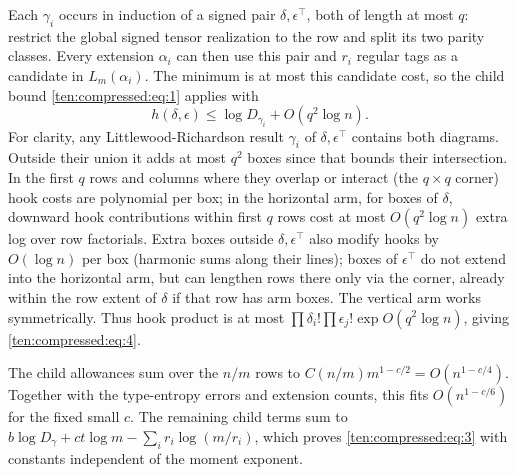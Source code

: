 Each $\gamma_i$ occurs in induction of a signed pair
$\delta,\epsilon^\top$, both of length at most $q$: restrict the
global signed tensor realization to the row and split its two parity
classes. Every extension $\alpha_i$ can then use this pair and
$r_i$ regular tags as a candidate in $L_m(\alpha_i)$.
The minimum is at most this candidate cost, so the child bound
\eqref{ten:compressed:eq:1} applies with
\begin{equation}
 h(\delta,\epsilon)\le\log D_{\gamma_i}+O(q^2\log n).
 \label{ten:compressed:eq:4}
\end{equation}
For clarity, any Littlewood-Richardson result \(\gamma_i\) of \(\delta,\epsilon^\top\) contains both diagrams. Outside their union it adds at most \(q^2\) boxes since that bounds their intersection. In the first \(q\) rows and columns where they overlap or interact (the \(q\times q\) corner) hook costs are polynomial per box; in the horizontal arm, for boxes of \(\delta\), downward hook contributions within first \(q\) rows cost at most \(O(q^2\log n)\) extra log over row factorials. Extra boxes outside \(\delta,\epsilon^\top\) also modify hooks by \(O(\log n)\) per box (harmonic sums along their lines); boxes of \(\epsilon^\top\) do not extend into the horizontal arm, but can lengthen rows there only via the corner, already within the row extent of \(\delta\) if that row has arm boxes. The vertical arm works symmetrically. Thus hook product is at most \(\prod\delta_i!\prod\epsilon_j!\exp O(q^2\log n)\), giving \eqref{ten:compressed:eq:4}.

The child allowances sum over the $n/m$ rows to
$C(n/m)m^{1-c/2}=O(n^{1-c/4})$.
Together with the type-entropy errors and extension counts, this
fits $O(n^{1-c/6})$ for the fixed small $c$. The remaining child
terms sum to $b\log D_\gamma+ct\log m-\sum_i r_i\log(m/r_i)$,
which proves \eqref{ten:compressed:eq:3} with constants independent
of the moment exponent.

